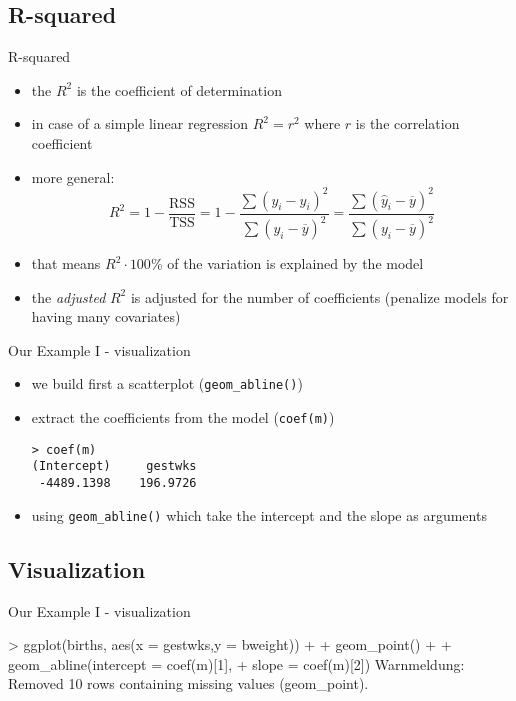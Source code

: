 \subsection{R-squared}
\begin{frame}{R-squared}
  \begin{itemize}
  \item the $R^2$ is the coefficient of determination
  \item in case of a simple linear regression $R^2=r^2$ where $r$ is the correlation coefficient
  \item more general: $$ R^2 = 1 - \frac{\text{RSS}}{\text{TSS}} = 1- \frac{\sum{(y_i - \hat{y}_i)^2}}{\sum(y_i - \overline{y})^2}= \frac{\sum{(\hat{y}_i - \overline{y})^2}}{\sum(y_i - \overline{y})^2}$$
  \item that means $R^2 \cdot 100$\% of the variation is explained by the model
  \item the \emph{adjusted} $R^2$ is adjusted for the number of coefficients (penalize models for having many covariates)
  \end{itemize}
  
\end{frame}

\begin{frame}[fragile]{Our Example I - visualization}
  \begin{itemize}
  \item we build first a scatterplot (\texttt{geom\_abline()})
  \item extract the coefficients from the model (\texttt{coef(m)})
\begin{verbatim}
> coef(m)
(Intercept)     gestwks 
 -4489.1398    196.9726 
\end{verbatim}
  \item using \texttt{geom\_abline()} which take the intercept and the slope as arguments
  \end{itemize}\footnotesize
\end{frame}


\subsection{Visualization}
\begin{frame}[fragile]{Our Example I - visualization}
\begin{semiverbatim}
> ggplot(births, aes(x = gestwks,y = bweight)) +
+     geom_point() +
+     geom_abline(intercept = coef(m)[1],
+                 slope = coef(m)[2])
Warnmeldung:
Removed 10 rows containing missing values (geom_point).  
\end{semiverbatim}      
\end{frame}



